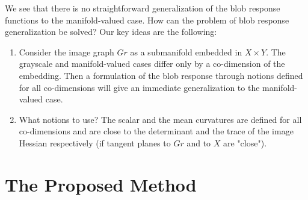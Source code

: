 \documentclass{llncs}
\begin{document}
We see that there is no straightforward generalization of the blob response functions to the manifold-valued case. How can the problem of blob response generalization be solved? Our key ideas are the following:

\begin{enumerate}
\item	Consider the image graph $Gr$ as a submanifold embedded in $X\times Y$. The grayscale and manifold-valued cases differ only by a co-dimension of the embedding. Then a formulation of the blob response through notions defined for all co-dimensions will give an immediate generalization to the manifold-valued case. 
\item	What notions to use? The scalar and the mean curvatures are defined for all co-dimensions and are close to the determinant and the trace of the image Hessian respectively (if tangent planes to $Gr$ and to $X$ are "close").
\end{enumerate}

\section{The Proposed Method}
\end{document}
